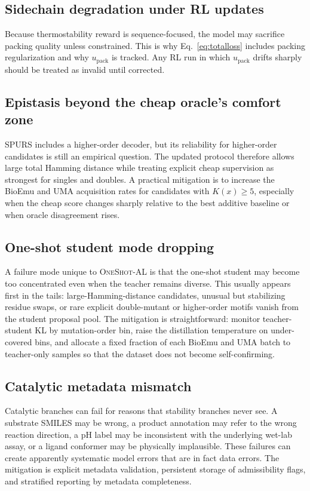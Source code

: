 \documentclass[11pt]{article}
\newcommand{\packunc}{\ensuremath{u_{\mathrm{pack}}}}
\newcommand{\methodIII}{\textsc{OneShot-AL}}
\begin{document}
	\subsection{Sidechain degradation under RL updates}
	
	Because thermostability reward is sequence-focused, the model may sacrifice packing quality unless constrained. This is why Eq.~\eqref{eq:totalloss} includes packing regularization and why \packunc{} is tracked. Any RL run in which \packunc{} drifts sharply should be treated as invalid until corrected.
	
	\subsection{Epistasis beyond the cheap oracle's comfort zone}
	
	SPURS includes a higher-order decoder, but its reliability for higher-order candidates is still an empirical question. The updated protocol therefore allows large total Hamming distance while treating explicit cheap supervision as strongest for singles and doubles. A practical mitigation is to increase the BioEmu and UMA acquisition rates for candidates with $K(x)\ge 5$, especially when the cheap score changes sharply relative to the best additive baseline or when oracle disagreement rises.
	
	\subsection{One-shot student mode dropping}
	
	A failure mode unique to \methodIII{} is that the one-shot student may become too concentrated even when the teacher remains diverse. This usually appears first in the tails: large-Hamming-distance candidates, unusual but stabilizing residue swaps, or rare explicit double-mutant or higher-order motifs vanish from the student proposal pool. The mitigation is straightforward: monitor teacher-student KL by mutation-order bin, raise the distillation temperature on under-covered bins, and allocate a fixed fraction of each BioEmu and UMA batch to teacher-only samples so that the dataset does not become self-confirming.
	
	\subsection{Catalytic metadata mismatch}
	
	Catalytic branches can fail for reasons that stability branches never see. A substrate SMILES may be wrong, a product annotation may refer to the wrong reaction direction, a pH label may be inconsistent with the underlying wet-lab assay, or a ligand conformer may be physically implausible. These failures can create apparently systematic model errors that are in fact data errors. The mitigation is explicit metadata validation, persistent storage of admissibility flags, and stratified reporting by metadata completeness.
	
\end{document}
